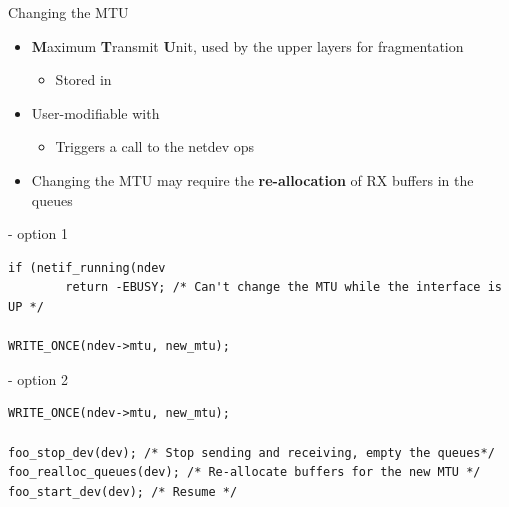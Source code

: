 \begin{frame}[fragile]{Changing the MTU}
	\begin{itemize}
		\item \textbf{M}aximum \textbf{T}ransmit \textbf{U}nit, used by the upper layers for fragmentation
			\begin{itemize}
				\item Stored in 
			\end{itemize}
		\item User-modifiable with 
			\begin{itemize}
				\item Triggers a call to the  netdev ops
			\end{itemize}
		\item Changing the MTU may require the \textbf{re-allocation} of RX buffers in the queues
	\end{itemize}
	\begin{block}{ - option 1}
		{\fontsize{8}{9}\selectfont
		\begin{verbatim}
if (netif_running(ndev
        return -EBUSY; /* Can't change the MTU while the interface is UP */

WRITE_ONCE(ndev->mtu, new_mtu);
		\end{verbatim}
		}
	\end{block}
	\begin{block}{ - option 2}
		{\fontsize{8}{9}\selectfont
		\begin{verbatim}
WRITE_ONCE(ndev->mtu, new_mtu);

foo_stop_dev(dev); /* Stop sending and receiving, empty the queues*/
foo_realloc_queues(dev); /* Re-allocate buffers for the new MTU */
foo_start_dev(dev); /* Resume */
		\end{verbatim}
		}
	\end{block}
\end{frame}

